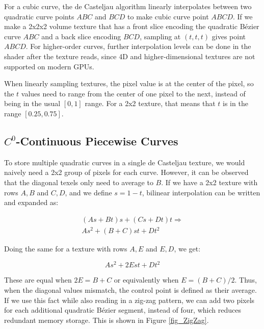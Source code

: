 \documentclass{jcgt}
\begin{document}
For a cubic curve, the de Casteljau algorithm linearly interpolates between two quadratic curve points $ABC$ and $BCD$ to make cubic curve point $ABCD$. If we make a 2x2x2 volume
texture that has a front slice encoding the quadratic Bézier curve $ABC$ and a back slice encoding $BCD$, sampling at $(t,t,t)$ gives point $ABCD$. For higher-order curves, further
interpolation levels can be done in the shader after the texture reads, since 4D and higher-dimensional textures are not supported on modern GPUs.

When linearly sampling textures, the pixel value is at the center of the pixel, so the $t$ values need to range from the center of one pixel to the next, instead of being in the usual
$[0,1]$ range. For a 2x2 texture, that means that $t$ is in the range $[0.25, 0.75]$.

\subsection{$C^0$-Continuous Piecewise Curves}



To store multiple quadratic curves in a single de Casteljau texture, we would naively need a 2x2 group of pixels for each curve. However, it can be observed that the diagonal texels
only need to average to $B$. If we have a 2x2 texture with rows $A, B$ and $C, D$, and we define $s = 1 - t$, bilinear interpolation can be written and expanded as:

\begin{equation}
\begin{split}
(As + Bt)s + (Cs + Dt)t \Rightarrow \\ As^2 + (B+C)st + Dt^2
\end{split}
\end{equation}

Doing the same for a texture with rows $A, E$ and $E, D$, we get:

\begin{equation}
As^2 + 2Est + Dt^2
\end{equation}

These are equal when $2E = B+C$ or equivalently when $E = (B+C)/2$.  Thus, when the diagonal values mismatch, the control point is defined as their average. If we use this fact
while also reading in a zig-zag pattern, we can add two pixels for each additional quadratic Bézier segment, instead of four, which reduces redundant memory storage. This is shown in Figure \ref{fig_ZigZag}.
\end{document}

